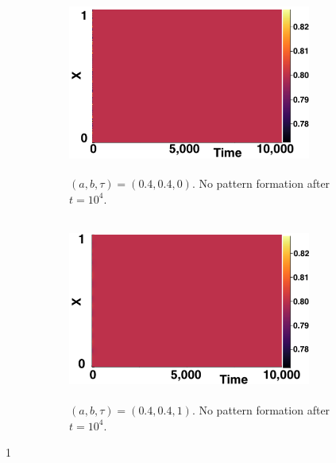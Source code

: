 \documentclass[12pt]{report}
\begin{document}
\begin{figure}[H]
    \centering
    \begin{subfigure}[b]{0.45\textwidth}
        \centering
        \includegraphics[width=8cm,height = 6cm]{nopatt1.png}
        \caption{$(a,b,\tau)=(0.4,0.4,0)$. No pattern formation after $t=10^4$. }
        \label{}
    \end{subfigure}
    \hfill
    \begin{subfigure}[b]{0.45\textwidth}
        \centering
        \includegraphics[width=8cm,height = 6cm]{nopatt2.png}
        \caption{$(a,b,\tau)=(0.4,0.4,1)$. No pattern formation after $t=10^4$.}
        \label{}
    \end{subfigure}
    \caption{}
    \label{fig:fixedsim1}
\end{figure}1
\end{document}
